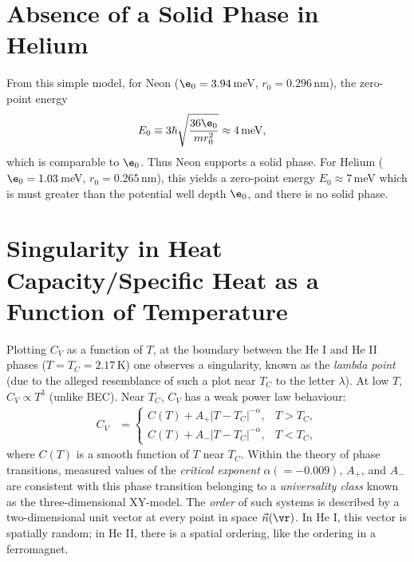 \documentclass[a4paper, 11pt, normalem]{report}
\begin{document}
\section{Absence of a Solid Phase in Helium}
From this simple model, for Neon ($\e_0=3.94\,$meV, $r_0=0.296\,$nm), the zero-point energy
\begin{align}
    E_0 &\equiv 3\hbar\sqrt{\frac{36\e_0}{mr_0^2}}\approx 4\,\text{meV},
\end{align}
which is comparable to $\e_0$.
Thus Neon supports a solid phase.
For Helium ($\e_0=1.03\,$meV, $r_0=0.265\,$nm), this yields a zero-point energy $E_0\approx7\,$meV which is must greater than the potential well depth $\e_0$, and there is no solid phase.

\section{Singularity in Heat Capacity/Specific Heat as a Function of Temperature}
Plotting $C_V$ as a function of $T$, at the boundary between the He I and He II phases ($T=T_C=2.17\,$K) one observes a singularity, known as the \emph{lambda point} (due to the alleged resemblance of such a plot near $T_C$ to the letter $\lambda$).
At low $T$, $C_V\propto T^3$ (unlike BEC).
Near $T_C$, $C_V$ has a weak power law behaviour:
\begin{align}
    C_V &= \begin{cases} C(T) + A_+|T-T_C|^{-\alpha}, & T > T_C, \\ C(T) + A_-|T-T_C|^{-\alpha}, & T < T_C,\end{cases}
\end{align}
where $C(T)$ is a smooth function of $T$ near $T_C$.
Within the theory of phase transitions, measured values of the \emph{critical exponent} $\alpha(=-0.009)$, $A_+$, and $A_-$ are consistent with this phase transition belonging to a \emph{universality class} known as the three-dimensional XY-model.
The \emph{order} of such systems is described by a two-dimensional unit vector at every point in space $\vec{n}(\vr)$.
In He I, this vector is spatially random; in He II, there is a spatial ordering, like the ordering in a ferromagnet.
\end{document}
